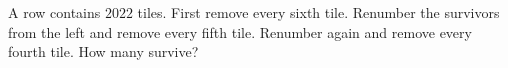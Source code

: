 A row contains $2022$ tiles. First remove every sixth tile. Renumber the survivors from the left and remove every fifth tile. Renumber again and remove every fourth tile. How many survive?
